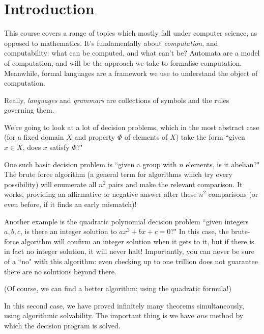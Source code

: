 \documentclass{article}
\begin{document}
\makecover

\section{Introduction}

This course covers a range of topics which mostly fall under computer science, as opposed to mathematics. It's fundamentally about \textit{computation}, and computability: what can be computed, and what can't be? Automata are a model of computation, and will be the approach we take to formalise computation. Meanwhile, formal languages are a framework we use to understand the object of computation.

Really, \textit{languages} and \textit{grammars} are collections of symbols and the rules governing them.

\begin{example}
	We're going to look at a lot of decision problems, which in the most abstract case (for a fixed domain $X$ and property $\Phi$ of elements of $X$) take the form ``given $x \in X$, does $x$ satisfy $\Phi$?"
	
	One such basic decision problem is ``given a group with $n$ elements, is it abelian?" The brute force algorithm (a general term for algorithms which try every possibility) will enumerate all $n^2$ pairs and make the relevant comparison. It works, providing an affirmative or negative answer after these $n^2$ comparisons (or even before, if it finds an early mismatch)!
		
	Another example is the quadratic polynomial decision problem ``given integers $a, b, c$, is there an integer solution to $ax^2 + bx + c = 0$?" In this case, the brute-force algorithm will confirm an integer solution when it gets to it, but if there is in fact no integer solution, it will never halt! Importantly, you can never be sure of a ``no" with this algorithm: even checking up to one trillion does not guarantee there are no solutions beyond there.
		
	(Of course, we can find a better algorithm: using the quadratic formula!)
\end{example}

In this second case, we have proved infinitely many theorems simultaneously, using algorithmic solvability. The important thing is we have \textit{one} method by which the decision program is solved.
\end{document}
